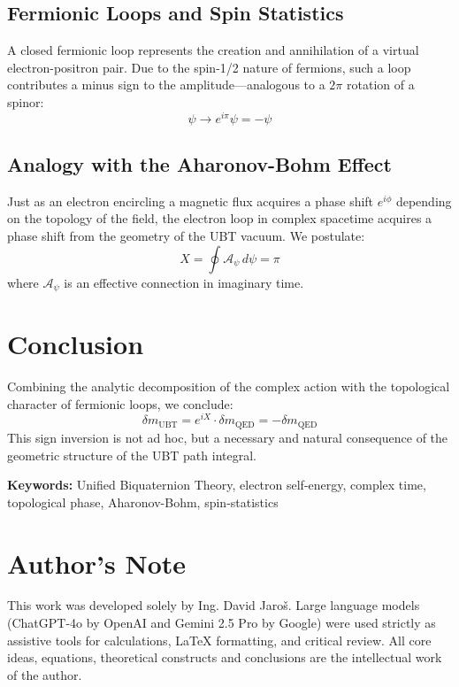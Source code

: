 \documentclass[12pt, a4paper]{article}
\begin{document}
\subsection{Fermionic Loops and Spin Statistics}

A closed fermionic loop represents the creation and annihilation of a virtual electron-positron pair. Due to the spin-1/2 nature of fermions, such a loop contributes a minus sign to the amplitude—analogous to a \( 2\pi \) rotation of a spinor:
\[
\psi \rightarrow e^{i\pi} \psi = -\psi
\]

\subsection{Analogy with the Aharonov-Bohm Effect}

Just as an electron encircling a magnetic flux acquires a phase shift \( e^{i\phi} \) depending on the topology of the field, the electron loop in complex spacetime acquires a phase shift from the geometry of the UBT vacuum. We postulate:
\[
X = \oint \mathcal{A}_{\psi} \, d\psi = \pi
\]
where \( \mathcal{A}_{\psi} \) is an effective connection in imaginary time.

\section{Conclusion}

Combining the analytic decomposition of the complex action with the topological character of fermionic loops, we conclude:
\[
\delta m_{\text{UBT}} = e^{iX} \cdot \delta m_{\text{QED}} = -\delta m_{\text{QED}}
\]
This sign inversion is not ad hoc, but a necessary and natural consequence of the geometric structure of the UBT path integral.

\bigskip
\noindent\textbf{Keywords:} Unified Biquaternion Theory, electron self-energy, complex time, topological phase, Aharonov-Bohm, spin-statistics


\section*{Author's Note}

This work was developed solely by Ing. David Jaroš.  
Large language models (ChatGPT-4o by OpenAI and Gemini 2.5 Pro by Google) were used strictly as assistive tools for calculations, LaTeX formatting, and critical review.  
All core ideas, equations, theoretical constructs and conclusions are the intellectual work of the author.
\end{document}
